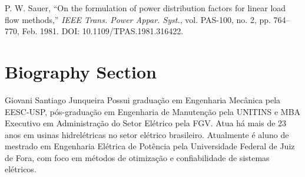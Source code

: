 \documentclass[journal]{IEEEtran}
\begin{document}

\begin{thebibliography}{1}


P. W. Sauer, ``On the formulation of power distribution factors for linear load flow methods,'' \textit{IEEE Trans. Power Appar. Syst.}, vol. PAS-100, no. 2, pp. 764--770, Feb. 1981. DOI: 10.1109/TPAS.1981.316422.


\end{thebibliography}


\newpage

\section{Biography Section}

\begin{IEEEbiography}{Giovani Santiago Junqueira}
Possui graduação em Engenharia Mecânica pela EESC-USP, pós-graduação em Engenharia de Manutenção pela UNITINS e MBA Executivo em Administração do Setor Elétrico pela FGV. Atua há mais de 23 anos em usinas hidrelétricas no setor elétrico brasileiro. Atualmente é aluno de mestrado em Engenharia Elétrica de Potência pela Universidade Federal de Juiz de Fora, com foco em métodos de otimização e confiabilidade de sistemas elétricos.
\end{IEEEbiography}
\end{document}
